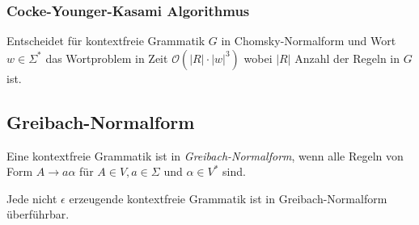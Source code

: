 \subsubsection*{Cocke-Younger-Kasami Algorithmus}

Entscheidet für kontextfreie Grammatik $G$ in Chomsky-Normalform und Wort $w \in \Sigma^*$ das Wortproblem in Zeit $\mathcal{O}(|R|\cdot |w|^3)$ wobei $|R|$ Anzahl der Regeln in $G$ ist.

\subsection*{Greibach-Normalform}

Eine kontextfreie Grammatik ist in \emph{Greibach-Normalform}, wenn alle Regeln von Form $A \to a\alpha$ für $A \in V, a \in \Sigma$ und $\alpha \in V^*$ sind.

\spacing

Jede nicht $\epsilon$ erzeugende kontextfreie Grammatik ist in Greibach-Normalform überführbar.
